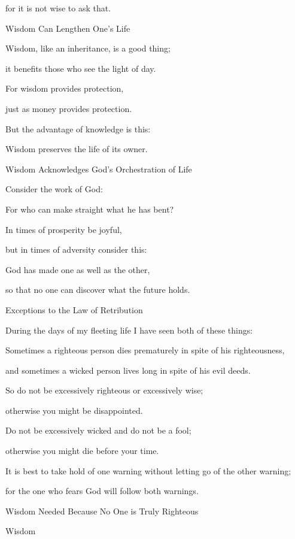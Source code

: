 {\par }{\Q for
it is not
wise
to ask that.
\par }{\SH Wisdom Can Lengthen One’s Life
\par }{\Q {}Wisdom,
like an inheritance,
is a good
thing;
\par }{\Q it benefits
those who see
the light of day.
\par }{\Q {}For
wisdom
provides protection,
\par }{\Q just as money
provides protection.
\par }{\Q But the advantage
of knowledge
is this:
\par }{\Q Wisdom
preserves
the life
of its owner.
\par }{\SH Wisdom Acknowledges God’s Orchestration of Life
\par }{\Q {}Consider
the work
of God:
\par }{\Q For
who can
make straight what he has bent?
\par }{\Q {}In times
of prosperity
be
joyful,
\par }{\Q but in times
of adversity
consider
this:
\par }{\Q God
has made
one as
well as the other,
\par }{\Q so that no
one
can discover
what the future
holds.
\par }{\SH Exceptions to the Law of Retribution
\par }{\Q {}During the days
of my fleeting life
I have seen
both of these things:
\par }{\Q Sometimes
a righteous person
dies prematurely
in spite of his righteousness,
\par }{\Q and sometimes
a wicked person
lives long
in spite of his evil deeds.
\par }{\Q {}So do not
be
excessively righteous
or
excessively
wise;
\par }{\Q otherwise
you might be disappointed.
\par }{\Q {}Do not
be excessively
wicked and do not
be a fool;
\par }{\Q otherwise
you might die
before your time.
\par }{\Q {}It is best
to take hold
of one warning
without
letting
go
of the other warning;
\par }{\Q for
the one who fears
God
will follow
both warnings.
\par }{\SH Wisdom Needed Because No One is Truly Righteous
\par }{\Q {}Wisdom
}
